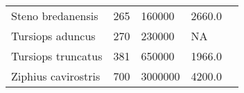 \begin{longtable}{|p{2.1in}p{0.5in}p{1.0in}p{1.0in}p{1.5in}|}
           Steno bredanensis  &          265 &      160000  &       2660.0   &                                 \citet{miyazaki1994} \\
            Tursiops aduncus  &          270 &      230000  &           NA   &                                    \citet{wells1999} \\
          Tursiops truncatus  &          381 &      650000  &       1966.0   &                                   \citet{perrin1984} \\
         Ziphius cavirostris  &          700 &     3000000  &       4200.0   &                                    \citet{omura1955} \\
  \hline
\end{longtable}

\scriptsize

